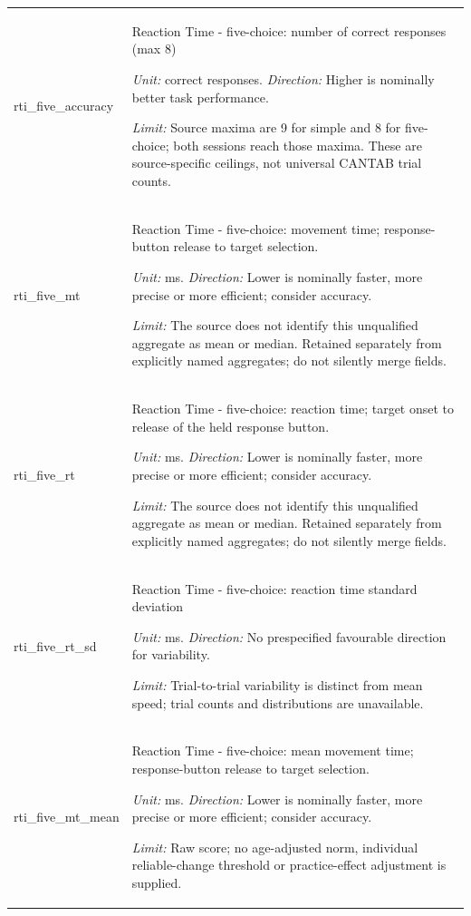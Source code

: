 \begin{longtable}{p{.26\linewidth}p{.66\linewidth}}
{\ttfamily\footnotesize rti\_\allowbreak{}five\_\allowbreak{}accuracy} & Reaction Time - five-choice: number of correct responses (max 8)\par\textit{Unit:} correct responses. \textit{Direction:} Higher is nominally better task performance.\par\textit{Limit:} Source maxima are 9 for simple and 8 for five-choice; both sessions reach those maxima. These are source-specific ceilings, not universal CANTAB trial counts. \\[7pt]
{\ttfamily\footnotesize rti\_\allowbreak{}five\_\allowbreak{}mt} & Reaction Time - five-choice: movement time; response-button release to target selection.\par\textit{Unit:} ms. \textit{Direction:} Lower is nominally faster, more precise or more efficient; consider accuracy.\par\textit{Limit:} The source does not identify this unqualified aggregate as mean or median. Retained separately from explicitly named aggregates; do not silently merge fields. \\[7pt]
{\ttfamily\footnotesize rti\_\allowbreak{}five\_\allowbreak{}rt} & Reaction Time - five-choice: reaction time; target onset to release of the held response button.\par\textit{Unit:} ms. \textit{Direction:} Lower is nominally faster, more precise or more efficient; consider accuracy.\par\textit{Limit:} The source does not identify this unqualified aggregate as mean or median. Retained separately from explicitly named aggregates; do not silently merge fields. \\[7pt]
{\ttfamily\footnotesize rti\_\allowbreak{}five\_\allowbreak{}rt\_\allowbreak{}sd} & Reaction Time - five-choice: reaction time standard deviation\par\textit{Unit:} ms. \textit{Direction:} No prespecified favourable direction for variability.\par\textit{Limit:} Trial-to-trial variability is distinct from mean speed; trial counts and distributions are unavailable. \\[7pt]
{\ttfamily\footnotesize rti\_\allowbreak{}five\_\allowbreak{}mt\_\allowbreak{}mean} & Reaction Time - five-choice: mean movement time; response-button release to target selection.\par\textit{Unit:} ms. \textit{Direction:} Lower is nominally faster, more precise or more efficient; consider accuracy.\par\textit{Limit:} Raw score; no age-adjusted norm, individual reliable-change threshold or practice-effect adjustment is supplied. \\[7pt]

\end{longtable}
